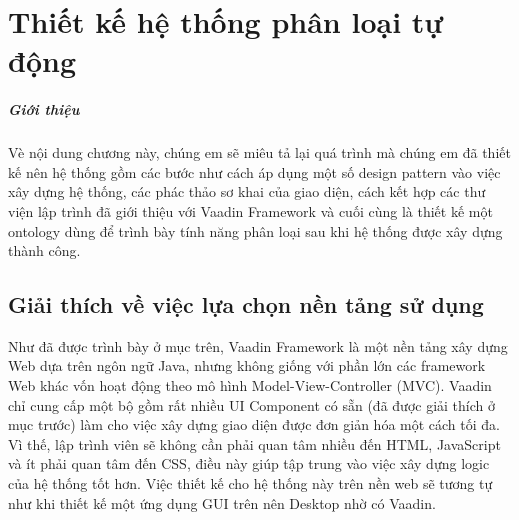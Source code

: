 \chapter{Thiết kế hệ thống phân loại tự động}
\paragraph{Giới thiệu} Vè nội dung chương này, chúng em sẽ miêu tả lại quá trình mà chúng em đã thiết kế nên hệ thống gồm các bước như cách áp dụng một số design pattern vào việc xây dựng hệ thống, các phác thảo sơ khai của giao diện, cách kết hợp các thư viện lập trình đã giới thiệu với Vaadin Framework và cuối cùng là thiết kế một ontology dùng để trình bày tính năng phân loại sau khi hệ thống được xây dựng thành công.
\section{Giải thích về việc lựa chọn nền tảng sử dụng}
Như đã được trình bày ở mục trên, Vaadin Framework là một nền tảng xây dựng Web dựa trên ngôn ngữ Java, nhưng không giống với phần lớn các framework Web khác vốn hoạt động theo mô hình Model-View-Controller (MVC). Vaadin chỉ cung cấp một bộ gồm rất nhiều UI Component có sẵn (đã được giải thích ở mục trước) làm cho việc xây dựng giao diện được đơn giản hóa một cách tối đa. Vì thế, lập trình viên sẽ không cần phải quan tâm nhiều đến HTML, JavaScript và ít phải quan tâm đến CSS, điều này giúp tập trung vào việc xây dựng logic của hệ thống tốt hơn. Việc thiết kế cho hệ thống này trên nền web sẽ tương tự như khi thiết kế một ứng dụng GUI trên nên Desktop nhờ có Vaadin.
